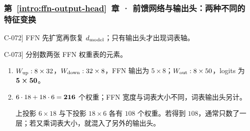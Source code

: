 \subsubsection*{第~\ref*{intro:ffn-output-head}~章 · 前馈网络与输出头：两种不同的特征变换}
\begin{answerhints}
\item[\hyperref[exercise:ffn-output-shapes]{C-072}] \leavevmode{}\label{hint:ffn-output-shapes}FFN 先扩宽再恢复 $d_{\rm model}$；只有输出头才出现词表轴。
\item[\hyperref[exercise:ffn-weight-count]{C-073}] \leavevmode{}\label{hint:ffn-weight-count}分别数两张 FFN 权重表的元素。
\end{answerhints}
\begin{enumerate}[label={},leftmargin=4.8em,itemsep=4pt]
\item[\textbf{\hyperref[exercise:ffn-output-shapes]{C-072.}}] \leavevmode{}\label{solution:C-072}\label{solution:ffn-output-shapes}$W_{\rm up}:8\times32$，$W_{\rm down}:32\times8$，FFN 输出为 $5\times8$；$W_{\rm out}:8\times50$，logits 为 $\boldsymbol{5\times50}$。
\item[\textbf{\hyperref[exercise:ffn-weight-count]{C-073.}}] \leavevmode{}\label{solution:C-073}\label{solution:ffn-weight-count}$6\cdot18+18\cdot6=\boldsymbol{216}$ 个权重；FFN 宽度与词表大小不同，词表输出头另计。\par 上投影 $6\times18$ 与下投影 $18\times6$ 各有 $108$ 个权重。若得到 $108$，通常只数了一层；若又乘词表大小，就混入了另外的输出头。
\end{enumerate}
